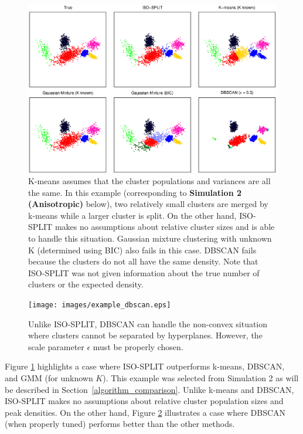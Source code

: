 \documentclass[10pt]{article}
\begin{document}
\begin{figure}
\begin{center}
\includegraphics[width=5.5in]{images/simulation2.eps}
\end{center}
\caption{
K-means assumes that the cluster populations and variances are all the same. In this example (corresponding to \textbf{Simulation 2 (Anisotropic)} below), two relatively small clusters are merged by k-means while a larger cluster is split. On the other hand, ISO-SPLIT makes no assumptions about relative cluster sizes and is able to handle this situation. Gaussian mixture clustering with unknown K (determined using BIC) also fails in this case. DBSCAN fails because the clusters do not all have the same density. Note that ISO-SPLIT was not given information about the true number of clusters or the expected density.
}
\label{fig:simulation2}
\end{figure}

\begin{figure}
\begin{center}
\texttt{[image: images/example\_dbscan.eps]}
\end{center}
\caption{
Unlike ISO-SPLIT, DBSCAN can handle the non-convex situation where clusters cannot be separated by hyperplanes. However, the scale parameter $\epsilon$ must be properly chosen.
}
\label{fig:example_dbscan}
\end{figure}

Figure \ref{fig:simulation2} highlights a case where ISO-SPLIT outperforms k-means, DBSCAN, and GMM (for unknown $K$). This example was selected from Simulation 2 as will be described in Section~\ref{algorithm_comparison}. Unlike k-means and DBSCAN, ISO-SPLIT makes no assumptions about relative cluster population sizes and peak densities. On the other hand, Figure \ref{fig:example_dbscan} illustrates a case where DBSCAN (when properly tuned) performs better than the other methods.
\end{document}
